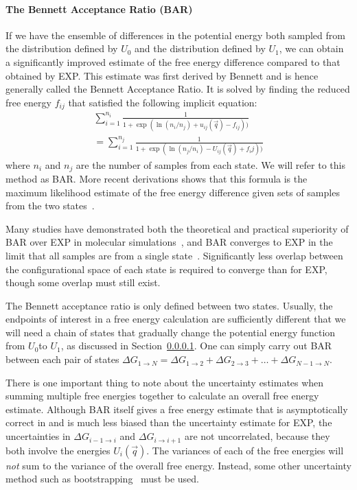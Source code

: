 \documentclass[9pt,bestpractices]{livecoms}
\begin{document}
\paragraph{The Bennett Acceptance Ratio (BAR)}

If we have the ensemble of differences in the potential energy both sampled from the distribution defined by $U_0$ and the distribution defined by $U_1$, we can obtain a significantly improved estimate of the
free energy difference compared to that obtained by EXP.  
This estimate was first derived by Bennett and is hence generally called the Bennett Acceptance Ratio.  It is solved by finding the reduced free energy $f_{ij}$ that satisfied the following implicit equation:
\begin{eqnarray}
 \sum_{i=1}^{n_i} \frac{1}{1 + \exp(\ln(n_i/n_j) + u_{ij}(\vec{q}) - f_{ij}))} \\
 =\sum_{i=1}^{n_j} \frac{1}{1 + \exp(\ln(n_j/n_i) - U_{ij}(\vec{q}) + f_ij))} 
\end{eqnarray}
where $n_i$ and $n_j$ are the number of samples from each state. We
will refer to this method as BAR. More recent derivations shows that this formula is the maximum likelihood estimate of the free energy difference
given sets of samples from the two states~\cite{shirts.bennett}. 

Many studies have demonstrated both the
theoretical and practical superiority of BAR over EXP in molecular
simulations~\cite{shirts.comparison,LuND:Appmcf}, and BAR converges to EXP in the limit that all samples are from a
single state~\cite{bennettCH,shirts.bennett}. Significantly less
overlap between the configurational space of each state is required to
converge than for EXP, though some overlap must still exist.

The Bennett acceptance ratio is only defined between two states.  Usually, the endpoints of interest in a free energy calculation are sufficiently different that we will need a chain of states that gradually change the potential energy function from $U_0$to $U_1$, as discussed in Section~\ref{}. One can simply carry out BAR between each pair of states $\Delta G_{1 \rightarrow N} = \Delta {G_{1\rightarrow 2}} + \Delta {G_{2\rightarrow 3}} +  \ldots + \Delta G_{N-1\rightarrow N}$.

There is one important thing to note about the uncertainty estimates when summing multiple free energies together to calculate an overall free energy estimate.  Although BAR itself gives a free energy estimate that is asymptotically correct in and is much less biased than the uncertainty estimate for EXP, the uncertainties in $\Delta {G_{i-1\rightarrow i}}$ and $\Delta {G_{i\rightarrow i+1}}$ are not uncorrelated, because they both involve the energies $U_i(\vec{q})$. The variances of each of the free energies will \textit{not} sum to the variance of the overall free energy. Instead, some other uncertainty method such as bootstrapping~\cite{???} must be used.
\end{document}
